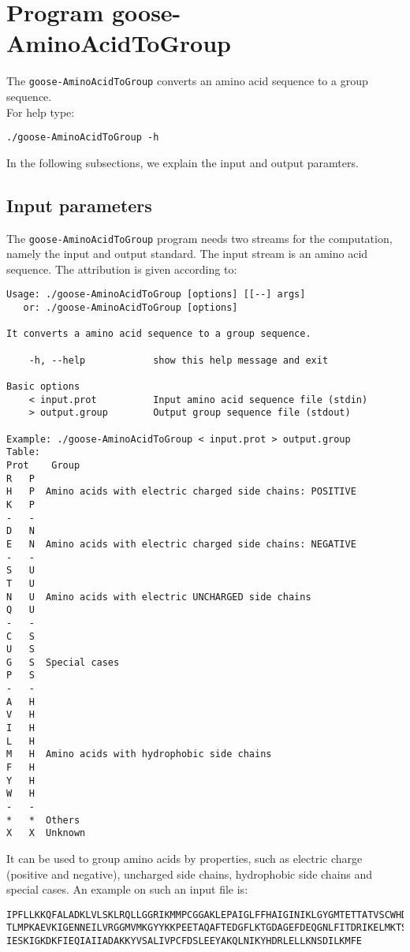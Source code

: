 \section{Program goose-AminoAcidToGroup}

The \texttt{goose-AminoAcidToGroup} converts an amino acid sequence to a group 
sequence.\\
For help type:
\begin{lstlisting}
./goose-AminoAcidToGroup -h
\end{lstlisting}
In the following subsections, we explain the input and output paramters.

\subsection*{Input parameters}

The \texttt{goose-AminoAcidToGroup} program needs two streams for the computation,
namely the input and output standard. The input stream is an amino acid sequence.
The attribution is given according to:
\begin{lstlisting}
Usage: ./goose-AminoAcidToGroup [options] [[--] args]
   or: ./goose-AminoAcidToGroup [options]

It converts a amino acid sequence to a group sequence.

    -h, --help            show this help message and exit

Basic options
    < input.prot          Input amino acid sequence file (stdin)
    > output.group        Output group sequence file (stdout)

Example: ./goose-AminoAcidToGroup < input.prot > output.group
Table:
Prot	Group
R	P
H	P  Amino acids with electric charged side chains: POSITIVE
K	P
-	-
D	N
E	N  Amino acids with electric charged side chains: NEGATIVE
-	-
S	U
T	U
N	U  Amino acids with electric UNCHARGED side chains
Q	U
-	-
C	S
U	S
G	S  Special cases
P	S
-	-
A	H
V	H
I	H
L	H
M	H  Amino acids with hydrophobic side chains
F	H
Y	H
W	H
-	-
*	*  Others
X	X  Unknown
\end{lstlisting}
It can be used to group amino acids by properties, such as electric charge (positive
and negative), uncharged side chains, hydrophobic side chains and special cases.
An example on such an input file is:
\begin{lstlisting}
IPFLLKKQFALADKLVLSKLRQLLGGRIKMMPCGGAKLEPAIGLFFHAIGINIKLGYGMTETTATVSCWHDFQFNPNSIG
TLMPKAEVKIGENNEILVRGGMVMKGYYKKPEETAQAFTEDGFLKTGDAGEFDEQGNLFITDRIKELMKTSNGKYIAPQY
IESKIGKDKFIEQIAIIADAKKYVSALIVPCFDSLEEYAKQLNIKYHDRLELLKNSDILKMFE
\end{lstlisting}

